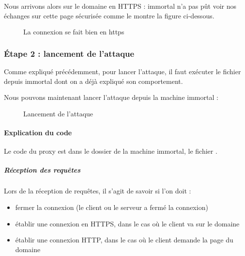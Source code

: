 Nous arrivons alors sur le domaine  en HTTPS : immortal n'a pas pût voir nos échanges sur cette page sécurisée comme le montre la figure ci-dessous.

\begin{figure}[H]
  \caption{La connexion se fait bien en https}
\end{figure}

\subsubsection{Étape 2 : lancement de l'attaque}

Comme expliqué précédemment, pour lancer l'attaque, il faut exécuter le fichier  depuis immortal dont on a déjà expliqué son comportement.

Nous pouvons maintenant lancer l'attaque depuis la machine immortal :


\begin{figure}[H]
  \caption{Lancement de l'attaque}
\end{figure}

\paragraph{Explication du code \\}

Le code du proxy est dans le dossier de la machine immortal, le fichier .

\subparagraph{Réception des requêtes \\}

Lors de la réception de requêtes, il s'agit de savoir si l'on doit :

\begin{itemize}
\item fermer la connexion (le client ou le serveur a fermé la connexion)
\item établir une connexion en HTTPS, dans le cas où le client va sur le domaine 
  \item établir une connexion HTTP, dans le cas où le client demande la page du domaine 
\end{itemize}

